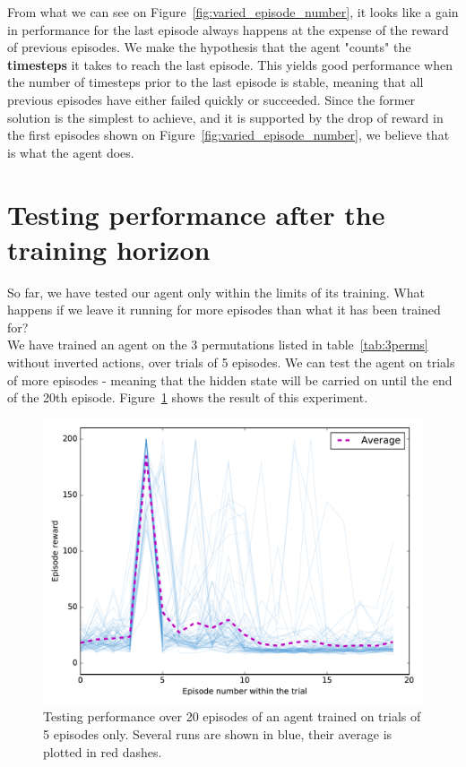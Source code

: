 From what we can see on Figure~\ref{fig:varied_episode_number}, it looks like
a gain in performance for the last episode always happens at the expense of
the reward of previous episodes. We make the hypothesis that the agent
"counts" the \textbf{timesteps} it takes to reach the last episode. This yields good
performance when the number of timesteps prior to the last episode is stable, 
meaning that all previous episodes have either failed quickly or succeeded. Since
the former solution is the simplest to achieve, and it is supported by the 
drop of reward in the first episodes shown on 
Figure~\ref{fig:varied_episode_number}, we believe that is what the agent does.


\section{Testing performance after the training horizon}
So far, we have tested our agent only within the limits of its training.
What happens if we leave it running for more episodes than what it
has been trained for?\\

We have trained an agent on the 3 permutations listed in table~\ref{tab:3perms}
without inverted actions, over trials of 5 episodes.
We can test the agent on trials of more episodes - meaning that the hidden
state will be carried on until the end of the 20th episode.
Figure~\ref{fig:horizon_5_3perms} shows the result of this experiment.\\

\begin{figure}
	\centering
	\includegraphics[width=0.8\linewidth]{fig/horizon_5_3perms.pdf}
	\caption{Testing performance over 20 episodes of an agent trained on 
	trials of 5 episodes only. Several runs are shown in blue, their
	average is plotted in red dashes.}
	\label{fig:horizon_5_3perms}
\end{figure}

